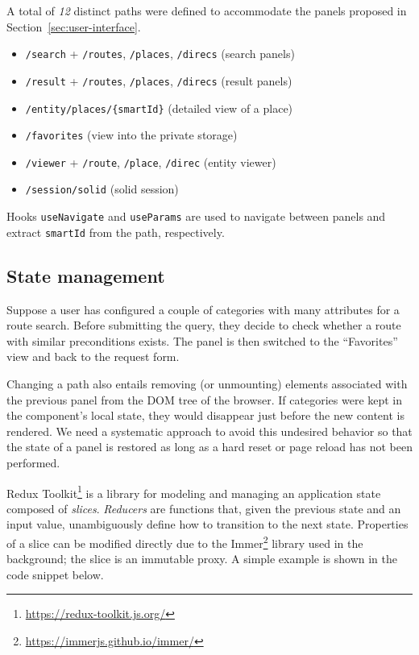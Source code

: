 A total of \emph{12} distinct paths were defined to accommodate the panels proposed in Section~\ref{sec:user-interface}.

\begin{itemize}
\item \texttt{/search} + \texttt{/routes}, \texttt{/places}, \texttt{/direcs} (search panels)
\item \texttt{/result} + \texttt{/routes}, \texttt{/places}, \texttt{/direcs} (result panels)
\item \texttt{/entity/places/\{smartId\}} (detailed view of a place)
\item \texttt{/favorites} (view into the private storage)
\item \texttt{/viewer} + \texttt{/route}, \texttt{/place}, \texttt{/direc} (entity viewer)
\item \texttt{/session/solid} (\acs{solid} session)
\end{itemize}

Hooks \texttt{useNavigate} and \texttt{useParams} are used to navigate between panels and extract \texttt{smartId} from the path, respectively.

\subsection{State management}

Suppose a user has configured a couple of categories with many attributes for a route search. Before submitting the query, they decide to check whether a route with similar preconditions exists. The panel is then switched to the ``Favorites'' view and back to the request form.

Changing a path also entails removing (or unmounting) elements associated with the previous panel from the DOM tree of the browser. If categories were kept in the component's local state, they would disappear just before the new content is rendered. We need a systematic approach to avoid this undesired behavior so that the state of a panel is restored as long as a hard reset or page reload has not been performed.

Redux Toolkit\footnote{\href{https://redux-toolkit.js.org/}{https://redux-toolkit.js.org/}} is a library for modeling and managing an application state composed of \emph{slices}. \emph{Reducers} are functions that, given the previous state and an input value, unambiguously define how to transition to the next state. Properties of a slice can be modified directly due to the Immer\footnote{\href{https://immerjs.github.io/immer/}{https://immerjs.github.io/immer/}} library used in the background; the slice is an immutable proxy. A simple example is shown in the code snippet below.

